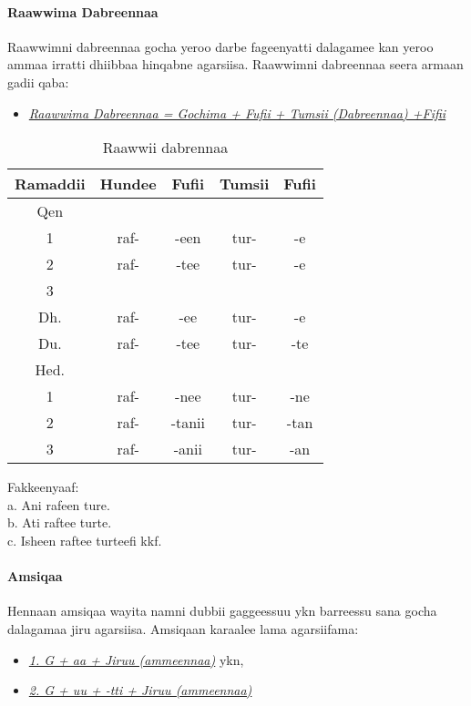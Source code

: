 \documentclass[11pt,b5paper]{book}
\begin{document}
\paragraph{Raawwima Dabreennaa}
Raawwimni dabreennaa gocha yeroo darbe fageenyatti dalagamee kan yeroo ammaa irratti dhiibbaa hinqabne agarsiisa. Raawwimni dabreennaa seera armaan gadii qaba:\\

\begin{itemize}
	\item \textit{\underline{Raawwima Dabreennaa = Gochima + Fufii + Tumsii (Dabreennaa) +Fifii}}
\end{itemize}

\begin{table}[H]
	\centering
	\caption{Raawwii dabrennaa}
	\begin{tabular}{ccccc}
		\hline\hline
		Ramaddii & Hundee & Fufii & Tumsii & Fufii \\
		\hline
		Qen &  &  &  &  \\
		1	& raf- & -een & tur- & -e		\\
		2	& raf- & -tee & tur- & -e	\\
		3 \\
		Dh.	& raf- & -ee & tur- & -e		\\
		Du.	& raf- & -tee & tur- & -te		\\
		\hline
		Hed. \\
		1   & raf- & -nee & tur- & -ne     \\
		2   & raf- & -tanii & tur- & -tan      \\
		3   & raf- & -anii & tur- & -an      \\
		\hline
		
	\end{tabular}
\end{table}

Fakkeenyaaf: \\
a. Ani rafeen ture.\\
b. Ati raftee turte.\\
c. Isheen raftee turteefi kkf.

\paragraph{Amsiqaa}
Hennaan amsiqaa wayita namni dubbii gaggeessuu ykn barreessu sana gocha dalagamaa jiru agarsiisa. Amsiqaan
karaalee lama agarsiifama: 

\begin{itemize}
	\item \textit{\underline{1. G + aa + Jiruu (ammeennaa)}} ykn,
	\item \textit{\underline{2. G + uu + -tti + Jiruu (ammeennaa) }}
\end{itemize}
\end{document}
